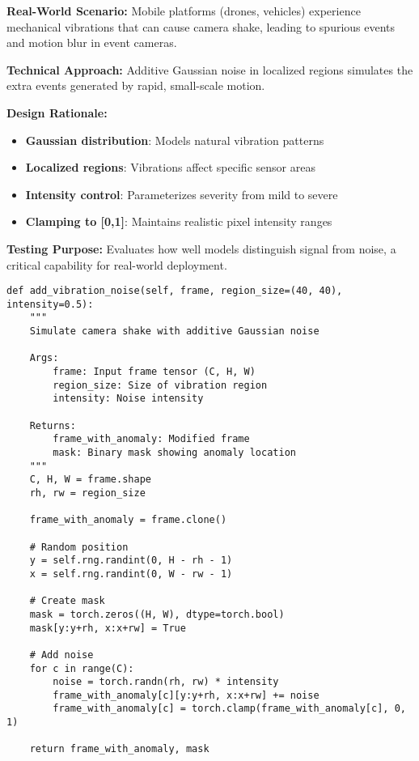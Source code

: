 \documentclass[12pt,a4paper]{article}
\begin{document}
\textbf{Real-World Scenario:} Mobile platforms (drones, vehicles) experience mechanical vibrations that can cause camera shake, leading to spurious events and motion blur in event cameras.

\textbf{Technical Approach:} Additive Gaussian noise in localized regions simulates the extra events generated by rapid, small-scale motion.

\textbf{Design Rationale:}
\begin{itemize}
    \item \textbf{Gaussian distribution}: Models natural vibration patterns
    \item \textbf{Localized regions}: Vibrations affect specific sensor areas
    \item \textbf{Intensity control}: Parameterizes severity from mild to severe
    \item \textbf{Clamping to [0,1]}: Maintains realistic pixel intensity ranges
\end{itemize}

\textbf{Testing Purpose:} Evaluates how well models distinguish signal from noise, a critical capability for real-world deployment.

\begin{lstlisting}[caption={Vibration Noise Implementation - Simulating Mechanical Disturbances}]
def add_vibration_noise(self, frame, region_size=(40, 40), intensity=0.5):
    """
    Simulate camera shake with additive Gaussian noise

    Args:
        frame: Input frame tensor (C, H, W)
        region_size: Size of vibration region
        intensity: Noise intensity

    Returns:
        frame_with_anomaly: Modified frame
        mask: Binary mask showing anomaly location
    """
    C, H, W = frame.shape
    rh, rw = region_size

    frame_with_anomaly = frame.clone()

    # Random position
    y = self.rng.randint(0, H - rh - 1)
    x = self.rng.randint(0, W - rw - 1)

    # Create mask
    mask = torch.zeros((H, W), dtype=torch.bool)
    mask[y:y+rh, x:x+rw] = True

    # Add noise
    for c in range(C):
        noise = torch.randn(rh, rw) * intensity
        frame_with_anomaly[c][y:y+rh, x:x+rw] += noise
        frame_with_anomaly[c] = torch.clamp(frame_with_anomaly[c], 0, 1)

    return frame_with_anomaly, mask
\end{lstlisting}
\end{document}
